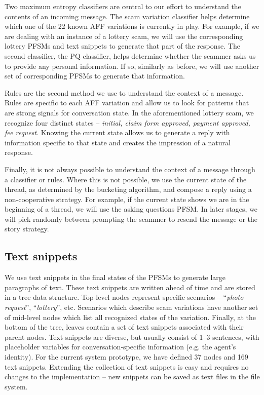 Two maximum entropy classifiers are central to our effort to understand the contents of an incoming message. The scam variation classifier helps determine which one of the 22 known AFF variations is currently in play. For example, if we are dealing with an instance of a lottery scam, we will use the corresponding lottery PFSMs and text snippets to generate that part of the response. The second classifier, the PQ classifier, helps determine whether the scammer asks us to provide any personal information. If so, similarly as before, we will use another set of corresponding PFSMs to generate that information.

Rules are the second method we use to understand the context of a message. Rules are specific to each AFF variation and allow us to look for patterns that are strong signals for conversation state. In the aforementioned lottery scam, we recognize four distinct states -- \textit{initial, claim form approved, payment approved, fee request}. Knowing the current state allows us to generate a reply with information specific to that state and creates the impression of a natural response.

Finally, it is not always possible to understand the context of a message through a classifier or rules.
Where this is not possible, we use the current state of the thread, as determined by the bucketing algorithm, and compose a reply using a non-cooperative strategy. For example, if the current state shows we are in the beginning of a thread, we will use the asking questions PFSM. In later stages, we will pick randomly between prompting the scammer to resend the message or the story strategy.

\subsection{Text snippets}

We use text snippets in the final states of the PFSMs to generate large paragraphs of text. These text snippets are written ahead of time and are stored in a tree data structure. Top-level nodes represent specific scenarios -- “\textit{photo request}”, “\textit{lottery}”, etc. Scenarios which describe scam variations have another set of mid-level nodes which list all recognized states of the variation. Finally, at the bottom of the tree, leaves contain a set of text snippets associated with their parent nodes. Text snippets are diverse, but usually consist of 1--3 sentences, with placeholder variables for conversation-specific information (e.g. the agent's identity). For the current system prototype, we have defined 37 nodes and 169 text snippets. Extending the collection of text snippets is easy and requires no changes to the implementation -- new snippets can be saved as text files in the file system.

